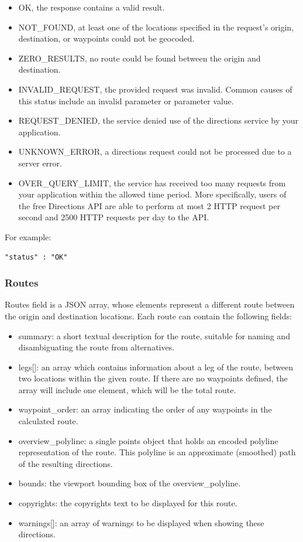 \begin{itemize}
 \item OK, the response contains a valid result. 
 \item NOT\_FOUND, at least one of the locations specified in the request's origin, destination, or waypoints could not be geocoded.
 \item ZERO\_RESULTS, no route could be found between the origin and destination.
 \item INVALID\_REQUEST, the provided request was invalid. Common causes of this status include an invalid parameter or parameter value.
 \item REQUEST\_DENIED, the service denied use of the directions service by your application. 
 \item UNKNOWN\_ERROR, a directions request could not be processed due to a server error. 
 \item OVER\_QUERY\_LIMIT, the service has received too many requests from your application within the allowed time period. 
 More specifically, users of the free Directions API are able to perform at most 2 HTTP request per second and 2500 HTTP requests per day to the API.

\end{itemize}

For example:

\begin{lstlisting}[basicstyle=\footnotesize\ttfamily, breaklines=true]
 "status" : "OK"
\end{lstlisting}

\subsubsection{Routes}

Routes field is a JSON array, whose elements represent a different route between the origin and destination locations. Each route can contain the following 
fields:

\begin{itemize}
 \item summary: a short textual description for the route, suitable for naming and disambiguating the route from alternatives.
 \item legs[]: an array which contains information about a leg of the route, between two locations within the given route. If there are no 
 waypoints defined, the array will include one element, which will be the total route. 
 \item waypoint\_order: an array indicating the order of any waypoints in the calculated route. 
 \item overview\_polyline: a single points object that holds an encoded polyline representation of the route. This polyline is an approximate 
 (smoothed) path of the resulting directions.
 \item bounds: the viewport bounding box of the overview\_polyline.
 \item copyrights: the copyrights text to be displayed for this route. 
 \item warnings[]: an array of warnings to be displayed when showing these directions.
\end{itemize}

